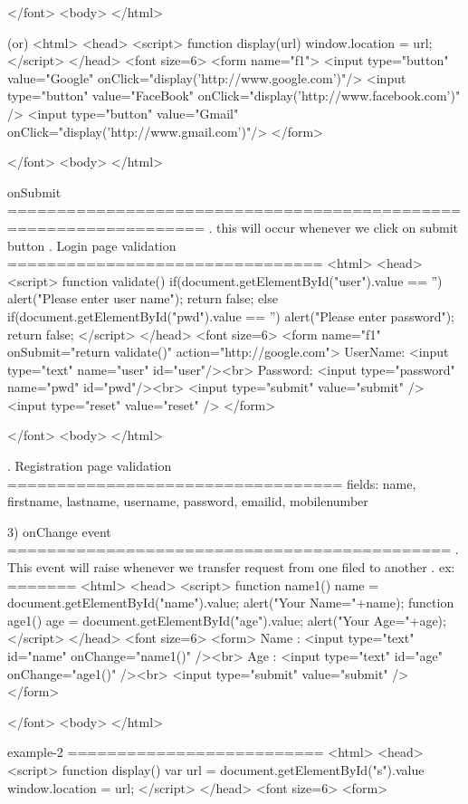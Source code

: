    </font>
  <body>
</html>

(or)
<html>
    <head>
	   <script>
	     function display(url)
		 {
			 window.location = url;
		 }
	   </script>
	</head>
    <font size=6>
     <form name="f1">
<input type="button" value="Google" onClick="display('http://www.google.com')"/>
<input type="button" value="FaceBook" onClick="display('http://www.facebook.com')" />
<input type="button" value="Gmail" onClick="display('http://www.gmail.com')"/>
	 </form>
	
   </font>
  <body>
</html>

onSubmit
==================================================================
. this will occur whenever we click on submit button
. Login page validation
================================
<html>
    <head>
	   <script>
	     function validate()
		 {
			 if(document.getElementById("user").value == '')
			 {
				 alert("Please enter user name");
				 return false;
			}
			else if(document.getElementById("pwd").value == '')
			{
				alert("Please enter password");
				return false;
			}
		 }
	   </script>
	</head>
    <font size=6>
     <form name="f1" onSubmit="return validate()" action="http://google.com">
	  UserName: <input type="text" name="user" id="user"/><br>
	  Password: <input type="password" name="pwd" id="pwd"/><br>
	  <input type="submit" value="submit" />
	  <input type="reset" value="reset" />
	 </form>
	
   </font>
  <body>
</html>

. Registration page validation
==================================
fields: name, firstname, lastname, username, password, emailid, mobilenumber


3) onChange event
=============================================
. This event will raise whenever we transfer request from one filed to another
. ex:
=======
<html>
    <head>
	   <script>
	    function name1()
		{
			name = document.getElementById("name").value;
  		    alert("Your Name="+name);
		}
		function age1(){
			age = document.getElementById("age").value;
			alert("Your Age="+age);
		}
	   </script>
	</head>
    <font size=6>
    <form>
	  Name : <input type="text" id="name" onChange="name1()" /><br>
	  Age  : <input type="text" id="age" onChange="age1()" /><br>
	  <input type="submit" value="submit" />
	</form>
	
   </font>
  <body>
</html>

example-2
==========================
<html>
    <head>
	   <script>
	    function display()
		{
			var url = document.getElementById("s").value
			window.location = url;
		}
	   </script>
	</head>
    <font size=6>
    <form>
	  
